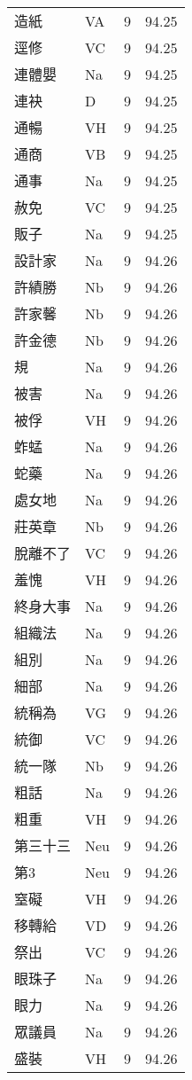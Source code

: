 \documentclass[twocolumn]{book}
\begin{document}
\begin{supertabular}{llrr}
造紙 & VA & 9 &  94.25\\
逕修 & VC & 9 &  94.25\\
連體嬰 & Na & 9 &  94.25\\
連袂 & D & 9 &  94.25\\
通暢 & VH & 9 &  94.25\\
通商 & VB & 9 &  94.25\\
通事 & Na & 9 &  94.25\\
赦免 & VC & 9 &  94.25\\
販子 & Na & 9 &  94.25\\
設計家 & Na & 9 &  94.26\\
許績勝 & Nb & 9 &  94.26\\
許家馨 & Nb & 9 &  94.26\\
許金德 & Nb & 9 &  94.26\\
規 & Na & 9 &  94.26\\
被害 & Na & 9 &  94.26\\
被俘 & VH & 9 &  94.26\\
蚱蜢 & Na & 9 &  94.26\\
蛇藥 & Na & 9 &  94.26\\
處女地 & Na & 9 &  94.26\\
莊英章 & Nb & 9 &  94.26\\
脫離不了 & VC & 9 &  94.26\\
羞愧 & VH & 9 &  94.26\\
終身大事 & Na & 9 &  94.26\\
組織法 & Na & 9 &  94.26\\
組別 & Na & 9 &  94.26\\
細部 & Na & 9 &  94.26\\
統稱為 & VG & 9 &  94.26\\
統御 & VC & 9 &  94.26\\
統一隊 & Nb & 9 &  94.26\\
粗話 & Na & 9 &  94.26\\
粗重 & VH & 9 &  94.26\\
第三十三 & Neu & 9 &  94.26\\
第3 & Neu & 9 &  94.26\\
窒礙 & VH & 9 &  94.26\\
移轉給 & VD & 9 &  94.26\\
祭出 & VC & 9 &  94.26\\
眼珠子 & Na & 9 &  94.26\\
眼力 & Na & 9 &  94.26\\
眾議員 & Na & 9 &  94.26\\
盛裝 & VH & 9 &  94.26\\

\end{supertabular}
\end{document}
